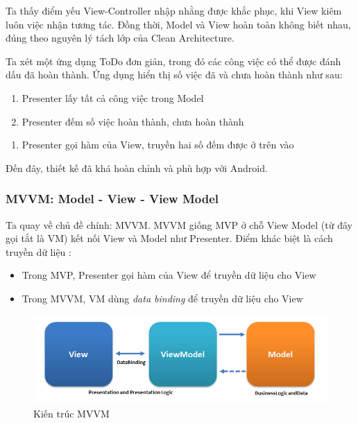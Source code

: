 \documentclass[../../thesis]{subfiles}
\begin{document}
Ta thấy điểm yếu View-Controller nhập nhằng được khắc phục, khi View kiêm luôn
việc nhận tương tác. Đồng thời, Model và View hoàn toàn không biết nhau, đúng
theo nguyên lý tách lớp của Clean Architecture.

Ta xét một ứng dụng ToDo đơn giản, trong đó các công việc có thể được đánh dấu
đã hoàn thành. Ứng dụng hiển thị số việc đã và chưa hoàn thành như sau:

\begin{enumerate}
    \item
        Presenter lấy tất cả công việc trong Model
    \item
        Presenter đếm số việc hoàn thành, chưa hoàn thành
\end{enumerate}

\begin{enumerate}[resume, before = \vspace*{-\dimexpr\topsep+\partopsep\relax}]
    \item
        Presenter gọi hàm của View, truyền hai số đếm được ở trên vào
\end{enumerate}

Đến đây, thiết kế đã khá hoàn chỉnh và phù hợp với Android.

\subsubsection{MVVM: Model - View - View Model}

Ta quay về chủ đề chính: MVVM. MVVM giống MVP ở chỗ View Model (từ đây gọi tắt
là VM) kết nối View và Model như Presenter. Điểm khác biệt là cách truyền dữ
liệu \cite{MUN_MVVM}:

\begin{itemize}
    \item
          Trong MVP, Presenter gọi hàm của View để truyền dữ liệu cho View
\end{itemize}

\begin{itemize}[resume, before = \vspace*{-\dimexpr\topsep+\partopsep\relax}]
    \item
          Trong MVVM, VM dùng \emph{data binding} để truyền dữ liệu cho View
\end{itemize}

\begin{figure}
    \centering
    \vspace*{-4mm}
    \includegraphics[width=\linewidth]{../images/MVVMPattern.png}
    \vspace*{-10mm}
    \caption{Kiến trúc MVVM \cite{MUN_MVVM}}
    \label{fig:mvvm}
\end{figure}
\end{document}
